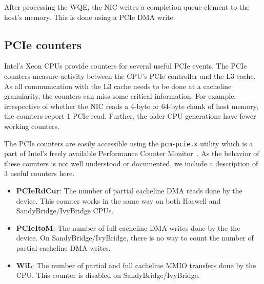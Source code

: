 After processing the WQE, the NIC writes a completion queue element to the
host's memory. This is done using a PCIe DMA write.

\subsection{PCIe counters}
Intel's Xeon CPUs provide counters for several useful PCIe events. The PCIe
counters measure activity between the CPU's PCIe controller and the L3 cache.
As all communication with the L3 cache needs to be done at a cacheline
granularity, the counters can miss some critical information. For example,
irrespective of whether the NIC reads a 4-byte or 64-byte chunk of host memory,
the counters report 1 PCIe read. Further, the older CPU generations have fewer
working counters.

The PCIe counters are easily accessible using the \texttt{pcm-pcie.x} utility
which is a part of Intel's freely available Performance Counter
Monitor~\cite{www-intel-pcm}. As the behavior of these counters is not well
understood or documented, we include a description of 3 useful counters here.

\begin{itemize}
\item \textbf{PCIeRdCur}: The number of partial cacheline DMA reads done by
the device. This counter works in the same way on both Haswell and
SandyBridge/IvyBridge CPUs.
\item \textbf{PCIeItoM}: The number of full cacheline DMA writes done by the
the device. On SandyBridge/IvyBridge, there is no way to count the number of
partial cacheline DMA writes.
\item \textbf{WiL}: The number of partial and full cacheline MMIO transfers
done by the CPU. This counter is disabled on SandyBridge/IvyBridge.
\end{itemize}
